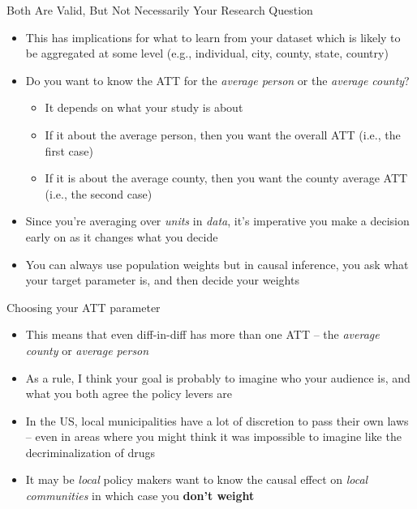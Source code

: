 \documentclass{beamer}
\begin{document}
\begin{frame}{Both Are Valid, But Not Necessarily Your Research Question}

\begin{itemize}
\item This has implications for what to learn from your dataset which is likely to be aggregated at some level (e.g., individual, city, county, state, country)
\item Do you want to know the ATT for the \emph{average person} or the \emph{average county}?
	\begin{itemize}
	\item It depends on what your study is about
	\item If it about the average person, then you want the overall ATT (i.e., the first case)
	\item If it is about the average county, then you want the county average ATT (i.e., the second case)
	\end{itemize}
\item Since you're averaging over \emph{units} in \emph{data}, it's imperative you make a decision early on as it changes what you decide
\item You can always use population weights but in causal inference, you ask what your target parameter is, and then decide your weights
\end{itemize}

\end{frame}

\begin{frame}{Choosing your ATT parameter}

\begin{itemize}

\item This means that even diff-in-diff has more than one ATT -- the \emph{average county} or \emph{average person}
\item As a rule, I think your goal is probably to imagine who your audience is, and what you both agree the policy levers are
\item In the US, local municipalities have a lot of discretion to pass their own laws -- even in areas where you might think it was impossible to imagine like the decriminalization of drugs
\item It may be \emph{local} policy makers want to know the causal effect on \emph{local communities} in which case you \textbf{don't weight}

\end{itemize}

\end{frame}
\end{document}
